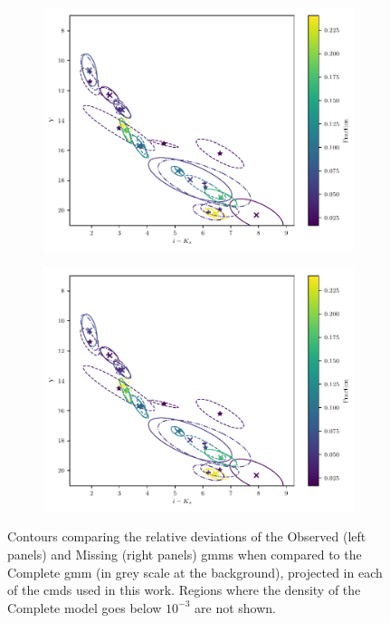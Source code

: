 \begin{figure}[ht!]
\begin{center}
\begin{subfigure}[t]{0.45\textwidth}
\end{subfigure}
\begin{subfigure}[t]{0.45\textwidth}
\includegraphics[page=6,width=\textwidth]{./background/Figures/validationMissing.pdf}
\end{subfigure}
\begin{subfigure}[t]{0.45\textwidth}
\includegraphics[page=8,width=\textwidth]{./background/Figures/validationMissing.pdf}
\end{subfigure}
\caption{Contours comparing the relative deviations of the Observed (left panels) and Missing (right panels) \glspl{gmm} when compared to the Complete \gls{gmm} (in grey scale at the background), projected in each of the \glspl{cmd} used in this work.  Regions where the density of the Complete model goes below $10^{-3}$ are not shown.}
\label{fig:ignorable_and_naive}
\end{center}
\end{figure}


